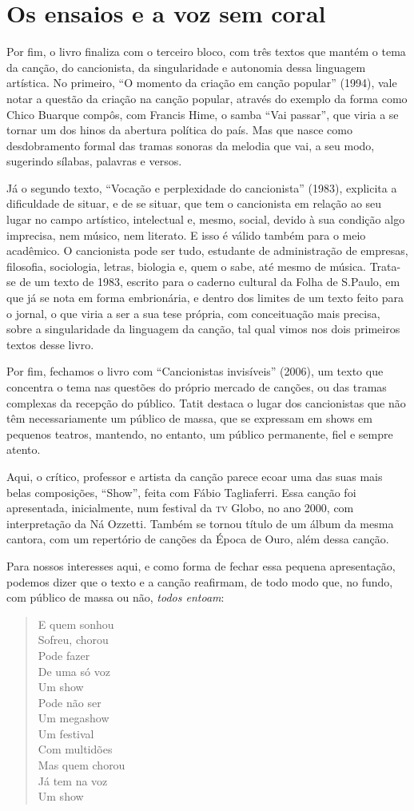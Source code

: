 \section{Os ensaios e a voz sem coral}

Por fim, o livro finaliza com o terceiro bloco, com três textos que
mantém o tema da canção, do cancionista, da singularidade e autonomia
dessa linguagem artística. No primeiro, ``O momento da criação em canção
popular'' (1994), vale notar a questão da criação na canção popular,
através do exemplo da forma como Chico Buarque compôs, com Francis Hime,
o samba ``Vai passar'', que viria a se tornar um dos hinos da abertura
política do país. Mas que nasce como desdobramento formal das tramas
sonoras da melodia que vai, a seu modo, sugerindo sílabas, palavras e
versos.

Já o segundo texto, ``Vocação e perplexidade do cancionista'' (1983),
explicita a dificuldade de situar, e de se situar, que tem o cancionista
em relação ao seu lugar no campo artístico, intelectual e, mesmo,
social, devido à sua condição algo imprecisa, nem músico, nem literato.
E isso é válido também para o meio acadêmico. O cancionista pode ser
tudo, estudante de administração de empresas, filosofia, sociologia,
letras, biologia e, quem o sabe, até mesmo de música. Trata-se de um
texto de 1983, escrito para o caderno cultural da Folha de S.Paulo, em
que já se nota em forma embrionária, e dentro dos limites de um texto
feito para o jornal, o que viria a ser a sua tese própria, com
conceituação mais precisa, sobre a singularidade da linguagem da canção,
tal qual vimos nos dois primeiros textos desse livro.

Por fim, fechamos o livro com ``Cancionistas invisíveis'' (2006), um
texto que concentra o tema nas questões do próprio mercado de canções,
ou das tramas complexas da recepção do público. Tatit destaca o lugar
dos cancionistas que não têm necessariamente um público de massa, que se
expressam em shows em pequenos teatros, mantendo, no entanto, um público
permanente, fiel e sempre atento.

Aqui, o crítico, professor e artista da canção parece ecoar uma das suas
mais belas composições, ``Show'', feita com Fábio Tagliaferri. Essa canção
foi apresentada, inicialmente, num festival da \textsc{tv} Globo, no ano 2000, com
interpretação da Ná Ozzetti. Também se tornou título de um álbum da
mesma cantora, com um repertório de canções da Época de Ouro, além dessa
canção.

Para nossos interesses aqui, e como forma de fechar essa pequena
apresentação, podemos dizer que o texto e a canção reafirmam, de todo
modo que, no fundo, com público de massa ou não, \emph{todos entoam}:

\begin{verse}
E quem sonhou\\
Sofreu, chorou\\
Pode fazer\\
De uma só voz\\
Um show\\
Pode não ser\\
Um megashow\\
Um festival\\
Com multidões\\
Mas quem chorou\\
Já tem na voz\\
Um show\\
\end{verse}
